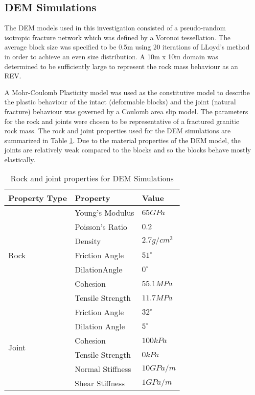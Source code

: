 \subsection{DEM Simulations}

The DEM models used in this investigation consisted of a pseudo-random isotropic fracture network which was defined by a Voronoi tessellation. The average block size was specified to be 0.5m using 20 iterations of LLoyd's method \citep{Lloyd_1982} in order to achieve an even size distribution. A 10m x 10m domain was determined to be sufficiently large to represent the rock mass behaviour as an REV. 

A Mohr-Coulomb Plasticity model was used as the constitutive model to describe the plastic behaviour of the intact  (deformable blocks) and the joint (natural fracture) behaviour was governed by a Coulomb area slip model. The parameters for the rock and joints were chosen to be representative of a fractured granitic rock mass. The rock and joint properties used for the DEM simulations are summarized in Table \ref{tab:demProp}. Due to the material properties of the DEM model, the joints are relatively weak compared to the blocks and so the blocks behave mostly elastically. 

\begin{table}[!htbp]
\centering
\caption{Rock and joint properties for DEM Simulations}
\label{tab:demProp}
\begin{tabular}{@{}lll@{}}
\toprule
Property Type          & Property         & Value        \\ \midrule
\multirow{7}{*}{Rock}  & Young's Modulus  & $65 GPa$     \\
                       & Poisson's Ratio  & $0.2$        \\
                       & Density          & $2.7 g/cm^3$ \\
                       & Friction Angle   & $51^{\circ}$ \\
                       & DilationAngle    & $0^{\circ}$  \\
                       & Cohesion         & $55.1 MPa$   \\
                       & Tensile Strength & $11.7 MPa$   \\ \cmidrule(r){1-1}
\multirow{6}{*}{Joint} & Friction Angle   & $32^{\circ}$ \\
                       & Dilation Angle   & $5^{\circ}$  \\
                       & Cohesion         & $100 kPa$    \\
                       & Tensile Strength & $0 kPa$      \\
                       & Normal Stiffness & $10 GPa/m$   \\
                       & Shear Stiffness  & $1 GPa/m$    \\ \bottomrule
\end{tabular}
\end{table}



